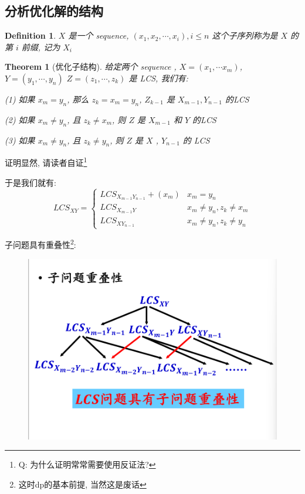 \documentclass[a4paper, 10pt]{ctexart} %
\newtheorem{theorem}{Theorem}
\newtheorem{definition}{Definition}
\begin{document}
\subsection{分析优化解的结构}
\begin{definition}
    $X$ 是一个 sequence, $\left(x_1, x_2, \cdots  ,x_i\right), i \le n$ 这个子序列称为是 $X$ 的第 $i$ 前缀, 记为 $X_{i}$
\end{definition}
\begin{theorem}[优化子结构]
    给定两个 sequence , $X = \left(x_1, \cdots  x_m\right)$, $Y = \left(y_1 , \cdots  ,y_n\right)$
    $Z= \left(z_1, \cdots  ,z_k\right)$ 是 LCS, 我们有:

    (1) 如果 $x_m = y_n$, 那么 $z_k =x_m = y_n$, $Z _{k-1}$ 是 $X _{m-1} , Y _{n-1}$ 的LCS

    (2) 如果 $x_m \ne y_n $, 且 $z_k \ne x_m$, 则 $Z$ 是 $X _{m-1 }$ 和 $Y$ 的LCS 

    (3) 如果 $x_m \ne y_n$, 且 $z_k \ne y_n$, 则 $Z$ 是 $X$ , $Y _{n-1}$ 的 LCS
\end{theorem}

证明显然, 请读者自证\footnote{Q: 为什么证明常常需要使用反证法?}

于是我们就有:
\[
LCS _{XY} = 
\begin{cases}
    LCS_{X _{m-1}Y_{n-1}} + \left(x_m\right) & x_m = y_n\\
    LCS _{X_{m-1}Y}  & x_m \ne y_n , z_k \ne x_m\\
    LCS _{X Y_{n-1}} & x_m \ne y_n , z_k \ne y_n
\end{cases}
\]

子问题具有重叠性\footnote{这时dp的基本前提, 当然这是废话}:
\begin{figure}[H]
    \centering
    \includegraphics[scale = 0.5]{11.png}
\end{figure}
\end{document}

